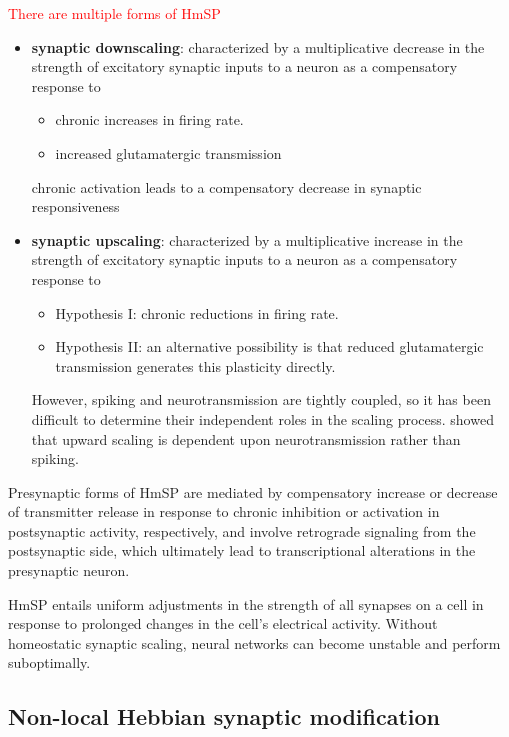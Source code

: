    
\textcolor{red}{There are multiple forms of HmSP}
\begin{itemize}
  
  \item {\bf synaptic downscaling}: characterized by a multiplicative decrease
  in the strength of excitatory synaptic inputs to a neuron as a compensatory response 
  to 
  \begin{itemize}
    \item chronic increases in firing rate.
    \item increased glutamatergic transmission
  \end{itemize}
  
chronic activation leads to a compensatory decrease in synaptic responsiveness

  \item {\bf synaptic upscaling}: characterized by a multiplicative increase in
  the strength of excitatory synaptic inputs to a neuron as a compensatory response
  to 
  \begin{itemize}
    \item  Hypothesis I:  chronic reductions in firing rate.
    \item  Hypothesis II: an alternative possibility is that reduced
    glutamatergic transmission generates this plasticity directly.
  \end{itemize}
  However, spiking and neurotransmission are tightly coupled, so it has been
  difficult to determine their independent roles in the scaling process.
  \citep{fong2015} showed that upward scaling is dependent upon
  neurotransmission rather than spiking.
  
  
\end{itemize}

Presynaptic forms of HmSP are mediated by compensatory increase or decrease of
transmitter release in response to chronic inhibition or activation in
postsynaptic activity, respectively, and involve retrograde signaling from the
postsynaptic side, which ultimately lead to transcriptional alterations in the
presynaptic neuron.

HmSP entails uniform adjustments in the strength of all synapses on a cell
in response to prolonged changes in the cell's electrical activity.
Without homeostatic synaptic scaling, neural networks can become unstable and
perform suboptimally.




\subsection{Non-local Hebbian synaptic modification}
\label{sec:non-local-synaptic-modification}

